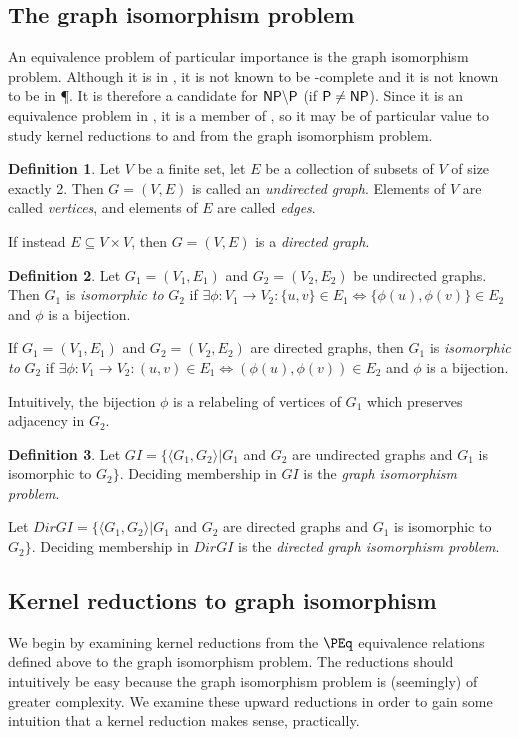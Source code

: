 \documentclass{article}
\theoremstyle{definition} \newtheorem{definition}[definition]{Definition}
\newcommand{\defn}[1]{\emph{#1}} %
\newcommand{\pair}[2]{\langle#1,#2\rangle} %
\begin{document}
\subsection{The graph isomorphism problem}

An equivalence problem of particular importance is the graph isomorphism
problem. Although it is in \NP, it is not known to be \NP-complete and it is
not known to be in \P. It is therefore a candidate for ${\mathsf{NP}}\backslash{\ensuremath{\mathsf{P}}}$ (if
${\mathsf{P}}\neq{\ensuremath{\mathsf{NP}}}$). Since it is an equivalence problem in \NP, it is a member of
\NPEq, so it may be of particular value to study kernel reductions to and from
the graph isomorphism problem. 

\begin{definition}
  Let $V$ be a finite set, let $E$ be a collection of subsets of $V$ of size
  exactly 2. Then $G=(V, E)$ is called an \defn{undirected graph}. Elements of
  $V$ are called \defn{vertices}, and elements of $E$ are called \defn{edges}.

  If instead $E\subseteq V\times V$, then $G=(V, E)$ is a \defn{directed
    graph}.
\end{definition}
\begin{definition}
  Let $G_1=(V_1,E_1)$ and $G_2=(V_2, E_2)$ be undirected graphs. Then $G_1$ is
  \defn{isomorphic to} $G_2$ if $\exists \phi\colon V_1\to V_2:\{u,v\}\in
  E_1\iff \{\phi(u), \phi(v)\}\in E_2$ and $\phi$ is a bijection.

  If $G_1=(V_1,E_1)$ and $G_2=(V_2, E_2)$ are directed graphs, then $G_1$ is
  \defn{isomorphic to} $G_2$ if $\exists \phi\colon V_1\to V_2:(u,v)\in E_1\iff
  (\phi(u), \phi(v))\in E_2$ and $\phi$ is a bijection.
\end{definition}
Intuitively, the bijection $\phi$ is a relabeling of vertices of $G_1$ which
preserves adjacency in $G_2$.

\begin{definition}
  Let $GI=\{\pair{G_1}{G_2}|G_1$ and $G_2$ are undirected graphs and $G_1$ is
  isomorphic to $G_2\}$. Deciding membership in $GI$ is the \defn{graph
    isomorphism problem}.

  Let $DirGI=\{\pair{G_1}{G_2}|G_1$ and $G_2$ are directed graphs and $G_1$ is
  isomorphic to $G_2\}$. Deciding membership in $DirGI$ is the \defn{directed
    graph isomorphism problem}.
\end{definition}

\subsection{Kernel reductions to graph isomorphism}
We begin by examining kernel reductions from the $\PEq$ equivalence relations
defined above to the graph isomorphism problem. The reductions should
intuitively be easy because the graph isomorphism problem is (seemingly) of
greater complexity. We examine these upward reductions in order to gain some
intuition that a kernel reduction makes sense, practically.
\end{document}

